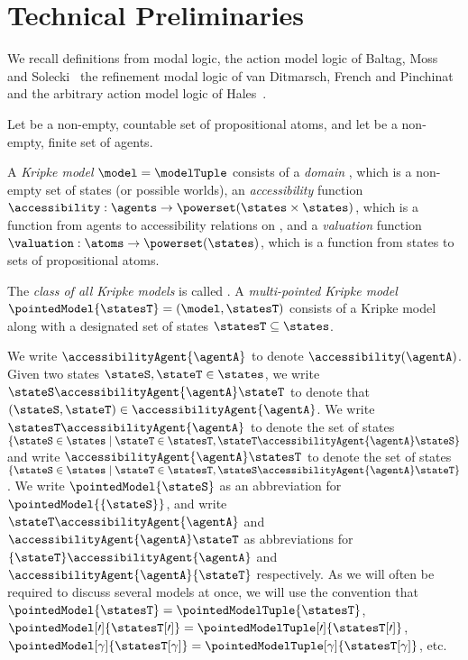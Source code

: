 \documentclass[twoside]{aiml14}
\begin{document}
  \section{Technical Preliminaries}\label{technical-preliminaries}

  We recall definitions from modal logic, the action model logic of Baltag,
  Moss and Solecki~\cite{baltag1998,baltag2005} the refinement modal logic of
  van Ditmarsch, French and Pinchinat~\cite{vanditmarsch2009,vanditmarsch2010}
  and the arbitrary action model logic of Hales~\cite{hales2013}.

  Let \atoms{} be a non-empty, countable set of propositional atoms, and let
  \agents{} be a non-empty, finite set of agents.

\begin{definition}\label{kripke-model}
  A {\em Kripke model} $\model = \modelTuple$ consists of 
  a {\em domain}  \states{}, which is a non-empty set of states 
  (or possible worlds), 
  an {\em accessibility} function 
  $\accessibility : \agents \to \powerset(\states \times \states)$, 
  which is a function from agents to accessibility relations on \states{}, 
  and a {\em valuation} function $\valuation : \atoms \to \powerset(\states)$,
  which is a function from states to sets of propositional atoms.

  The {\em class of all Kripke models} is called \classK{}. 
  A {\em multi-pointed Kripke model} $\pointedModel{\statesT} = (\model,
  \statesT)$ consists of a Kripke model \model{} along with a designated set of
  states $\statesT \subseteq \states$.
  \end{definition}

  We write $\accessibilityAgent{\agentA}$ to denote $\accessibility(\agentA)$.
  Given two states $\stateS, \stateT \in \states$, 
  we write $\stateS \accessibilityAgent{\agentA} \stateT$ to denote that 
  $(\stateS, \stateT) \in \accessibilityAgent{\agentA}$. 
  We write $\statesT \accessibilityAgent{\agentA}$ to denote the set of states 
  $\{\stateS \in \states \mid \stateT \in \statesT, \stateT \accessibilityAgent{\agentA} \stateS \}$
  and write $\accessibilityAgent{\agentA} \statesT$ to denote the set of states 
  $\{\stateS \in \states \mid \stateT \in \statesT, \stateS \accessibilityAgent{\agentA} \stateT \}$.
  We write $\pointedModel{\stateS}$ as an abbreviation for 
  $\pointedModel{\{\stateS\}}$, and write $\stateT \accessibilityAgent{\agentA}$
  and $\accessibilityAgent{\agentA} \stateT$ as abbreviations for 
  $\{\stateT\} \accessibilityAgent{\agentA}$ and 
  $\accessibilityAgent{\agentA} \{\stateT\}$ respectively.
  As we will often be required to discuss several models at once, we will use
  the convention that 
  $\pointedModel{\statesT} = \pointedModelTuple{\statesT}$,
  $\pointedModel[\prime]{\statesT[\prime]} = \pointedModelTuple[\prime]{\statesT[\prime]}$,
  $\pointedModel[\gamma]{\statesT[\gamma]} = \pointedModelTuple[\gamma]{\statesT[\gamma]}$,
  etc.
\end{document}
